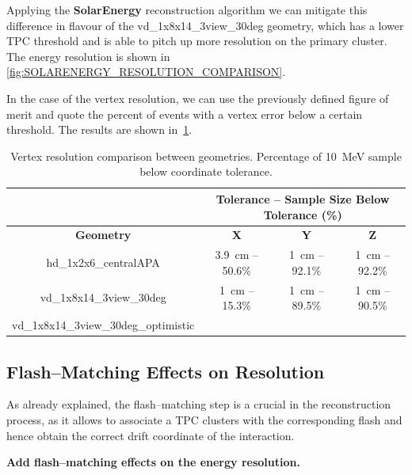Applying the \textbf{SolarEnergy} reconstruction algorithm we can mitigate this difference in flavour of the vd\_1x8x14\_3view\_30deg geometry, which has a lower TPC threshold and is able to pitch up more resolution on the primary cluster. The energy resolution is shown in \cref{fig:SOLARENERGY_RESOLUTION_COMPARISON}.

In the case of the vertex resolution, we can use the previously defined figure of merit and quote the percent of events with a vertex error below a certain threshold. The results are shown in~\cref{tab:VERTEX_ERROR_COMPARISON}.

\begin{table}[ht]
    \centering
    \begin{tabular}{cccc}
        & \multicolumn{3}{c}{Tolerance -- Sample Size Below Tolerance (\%)}\\
        \hline
        \textbf{Geometry} & \textbf{X} & \textbf{Y} & \textbf{Z}\\
        \hline\hline
        hd\_1x2x6\_centralAPA & \SI{3.9}{\centi\meter} -- \num{50.6}\% & \SI{1}{\centi\meter} -- \num{92.1}\% & \SI{1}{\centi\meter} -- \num{92.2}\%\\
        vd\_1x8x14\_3view\_30deg & \SI{1}{\centi\meter} -- \num{15.3}\% & \SI{1}{\centi\meter} -- \num{89.5}\% & \SI{1}{\centi\meter} -- \num{90.5}\%\\
        vd\_1x8x14\_3view\_30deg\_optimistic & & & \\
        \hline
    \end{tabular}
    \caption[width=1\linewidth]{Vertex resolution comparison between geometries. Percentage of \SI{10}{\mega\electronvolt} sample below coordinate tolerance.\label{tab:VERTEX_ERROR_COMPARISON}}
\end{table}

\subsection{Flash--Matching Effects on Resolution}\label{sec:FLASH_MATCHING_EFFECT}
As already explained, the flash--matching step is a crucial in the reconstruction process, as it allows to associate a TPC clusters with the corresponding flash and hence obtain the correct drift coordinate of the interaction.

\textbf{Add flash--matching effects on the energy resolution.}